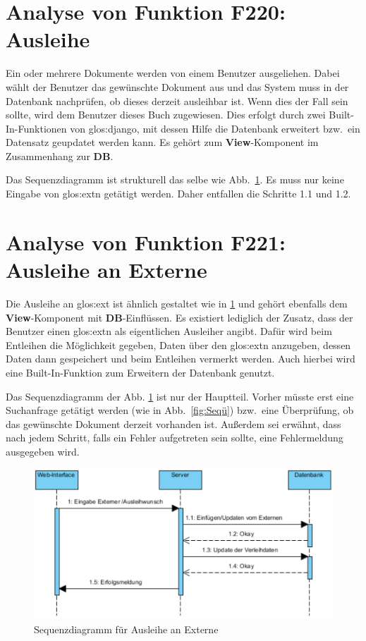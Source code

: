 \section{Analyse von Funktion F220: Ausleihe}
\label{f:220}
Ein oder mehrere Dokumente werden von einem Benutzer ausgeliehen. Dabei wählt der Benutzer das gewünschte Dokument aus und das System muss in der Datenbank nachprüfen, ob dieses derzeit ausleihbar ist. Wenn dies der Fall sein sollte, wird dem Benutzer dieses Buch zugewiesen. Dies erfolgt durch zwei Built-In-Funktionen von \gls{glos:django}, mit dessen Hilfe die Datenbank erweitert bzw.\ ein Datensatz geupdatet werden kann. Es gehört zum \textbf{View}-Komponent im Zusammenhang zur \textbf{DB}.

Das Sequenzdiagramm ist strukturell das selbe wie Abb.\ \ref{fig:221}. Es muss nur keine Eingabe von \gls{glos:ext}n getätigt werden. Daher entfallen die Schritte 1.1 und 1.2. 

\section{Analyse von Funktion F221: Ausleihe an Externe}
\label{f:221}
Die Ausleihe an \gls{glos:ext} ist ähnlich gestaltet wie in \ref{f:220}  und gehört ebenfalls dem \textbf{View}-Komponent mit \textbf{DB}-Einflüssen. Es existiert lediglich der Zusatz, dass der Benutzer einen \gls{glos:ext}n als eigentlichen Ausleiher angibt. Dafür wird beim Entleihen die Möglichkeit gegeben, Daten über den \gls{glos:ext}n anzugeben, dessen Daten dann gespeichert und beim Entleihen vermerkt werden. Auch hierbei wird eine Built-In-Funktion zum Erweitern der Datenbank genutzt.

Das Sequenzdiagramm der Abb. \ref{fig:221} ist nur der Hauptteil. Vorher müsste erst eine Suchanfrage getätigt werden (wie in Abb.\ \ref{fig:Seqü}) bzw.\ eine Überprüfung, ob das gewünschte Dokument derzeit vorhanden ist. Außerdem sei erwähnt, dass nach jedem Schritt, falls ein Fehler aufgetreten sein sollte, eine Fehlermeldung ausgegeben wird.

\begin{figure}
\begin{center}
\includegraphics[width=0.8\linewidth]{bilder/Seq-Ausleihe.pdf}
\caption{Sequenzdiagramm für Ausleihe an Externe}
\label{fig:221}
\end{center}
\end{figure}


